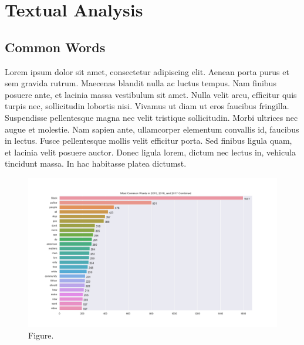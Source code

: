 \documentclass[11pt]{article}
\theoremstyle{definition}
\begin{document}

\section*{\centering Textual Analysis}

\subsection*{\centering Common Words}

Lorem ipsum dolor sit amet, consectetur adipiscing elit.
Aenean porta purus et sem gravida rutrum.
Maecenas blandit nulla ac luctus tempus.
Nam finibus posuere ante, et lacinia massa vestibulum sit amet.
Nulla velit arcu, efficitur quis turpis nec, sollicitudin lobortis nisi.
Vivamus ut diam ut eros faucibus fringilla.
Suspendisse pellentesque magna nec velit tristique sollicitudin.
Morbi ultrices nec augue et molestie.
Nam sapien ante, ullamcorper elementum convallis id, faucibus in lectus.
Fusce pellentesque mollis velit efficitur porta.
Sed finibus ligula quam, et lacinia velit posuere auctor.
Donec ligula lorem, dictum nec lectus in, vehicula tincidunt massa.
In hac habitasse platea dictumst.

\begin{figure}[H]
\centering
\includegraphics[width=\textwidth]{../visualization/barchart-plots/barchart_word_counts.png}
\caption*{Figure.}
\end{figure}

\end{document}
